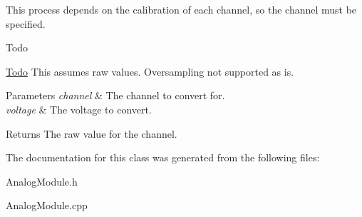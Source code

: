 \-This process depends on the calibration of each channel, so the channel must be specified.

\begin{DoxyRefDesc}{\-Todo}
\item[\hyperlink{todo__todo000001}{\-Todo}]\-This assumes raw values. \-Oversampling not supported as is.\end{DoxyRefDesc}



\begin{DoxyParams}{\-Parameters}
{\em channel} & \-The channel to convert for. \\
\hline
{\em voltage} & \-The voltage to convert. \\
\hline
\end{DoxyParams}
\begin{DoxyReturn}{\-Returns}
\-The raw value for the channel. 
\end{DoxyReturn}


\-The documentation for this class was generated from the following files\-:\begin{DoxyCompactItemize}
\item 
\-Analog\-Module.\-h\item 
\-Analog\-Module.\-cpp\end{DoxyCompactItemize}
